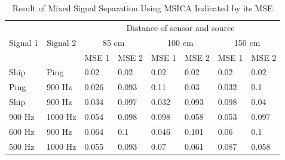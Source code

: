 \documentclass[a4paper]{jpconf}
\begin{document}
\begin{table}[h]
\centering
\caption{Result of Mixed Signal Separation Using MSICA Indicated by its MSE}
\label{table:msemsica}
\begin{tabular}{|l|l|l|l|l|l|l|l|}
\hline
\multicolumn{1}{|c|}{\multirow{3}{*}{Signal 1}} & \multicolumn{1}{c|}{\multirow{3}{*}{Signal 2}} & \multicolumn{6}{c|}{Distance of sensor and source}                                                                                                                          \\ \cline{3-8} 
\multicolumn{1}{|c|}{}                          & \multicolumn{1}{c|}{}                          & \multicolumn{2}{c|}{85 cm}                              & \multicolumn{2}{c|}{100 cm}                             & \multicolumn{2}{c|}{150 cm}                             \\ \cline{3-8} 
\multicolumn{1}{|c|}{}                          & \multicolumn{1}{c|}{}                          & \multicolumn{1}{c|}{MSE 1} & \multicolumn{1}{c|}{MSE 2} & \multicolumn{1}{c|}{MSE 1} & \multicolumn{1}{c|}{MSE 2} & \multicolumn{1}{c|}{MSE 1} & \multicolumn{1}{c|}{MSE 2} \\ \hline
Ship                                            & Ping                                           & 0.02                       & 0.02                       & 0.02                       & 0.02                       & 0.02                       & 0.02                       \\ \hline
Ping                                            & 900 Hz                                         & 0.026                      & 0.093                      & 0.11                       & 0.03                       & 0.032                      & 0.1                        \\ \hline
Ship                                            & 900 Hz                                         & 0.034                      & 0.097                      & 0.032                      & 0.093                      & 0.098                      & 0.04                       \\ \hline
900 Hz                                          & 1000 Hz                                        & 0.054                      & 0.098                      & 0.098                      & 0.058                      & 0.053                      & 0.097                      \\ \hline
600 Hz                                          & 900 Hz                                         & 0.064                      & 0.1                        & 0.046                      & 0.101                      & 0.06                       & 0.1                        \\ \hline
500 Hz                                          & 1000 Hz                                        & 0.055                      & 0.093                      & 0.07                       & 0.061                      & 0.087                      & 0.058                      \\ \hline
\end{tabular}
\end{table}
\end{document}

